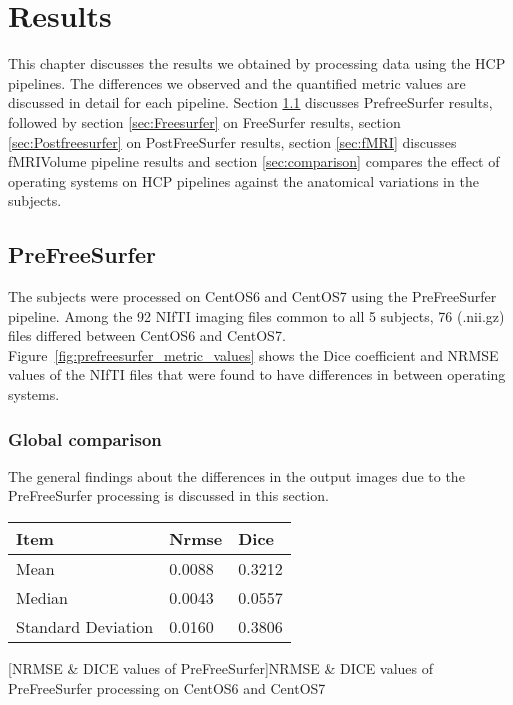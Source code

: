 \chapter{Results}\label{results}
This chapter discusses the results we obtained by processing data using the HCP pipelines. The differences we observed and the quantified metric values are discussed in detail for each pipeline. Section \ref{sec:Prefreesurfer} discusses PrefreeSurfer results, followed by section \ref{sec:Freesurfer} on FreeSurfer results, section \ref{sec:Postfreesurfer} on PostFreeSurfer results, section \ref{sec:fMRI} discusses fMRIVolume pipeline results and section \ref{sec:comparison} compares the effect of operating systems on HCP pipelines against the anatomical variations in the subjects.

\section{PreFreeSurfer} \label{sec:Prefreesurfer}
The subjects were processed on CentOS6 and CentOS7 using the PreFreeSurfer pipeline. Among the 92 NIfTI imaging files common to all 5 subjects, 76 (.nii.gz) files differed between CentOS6 and CentOS7. Figure~\ref{fig:prefreesurfer_metric_values} shows the Dice coefficient and NRMSE values of the NIfTI files that were found to have differences in between operating systems.

\subsection{Global comparison}
The general findings about the differences in the output images due to the PreFreeSurfer processing is discussed in this section.

\begin{center}
\begin{tabular}{|l|l|l|}
\hline
\textbf{Item}      & \textbf{Nrmse} & \textbf{Dice} \\ \hline
Mean               & 0.0088   & 0.3212   \\ \hline
Median             & 0.0043    & 0.0557    \\ \hline
Standard Deviation & 0.0160    & 0.3806   \\ \hline
\end{tabular}
[NRMSE \& DICE values of PreFreeSurfer]{NRMSE \& DICE values of PreFreeSurfer processing on CentOS6 and CentOS7}
\label{tab:PreFreeSurfer_Metic_Values}
\end{center}

